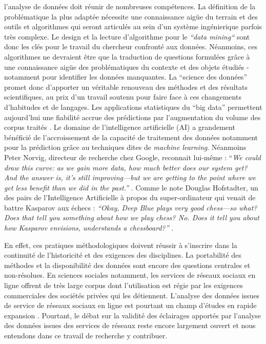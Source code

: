 l{\textquoteright}analyse de donn\'ees doit r\'eunir de nombreuses
comp\'etences. La d\'efinition de la probl\'ematique la plus adapt\'ee
n\'ecessite une connaissance aig\"ue du terrain et des outils et
algorithmes qui seront articul\'es au sein d{\textquoteright}un
syst\`eme ing\'enierique parfois tr\`es complexe. Le design et la
lecture d{\textquoteright}algorithme pour le
\textit{{\textquotedblleft}data mining{\textquotedblleft}} sont donc
les cl\'es pour le travail du chercheur confront\'e aux donn\'ees.
N\'eanmoins, ces algorithmes ne devraient \^etre que la traduction de
questions formul\'ees gr\^ace \`a une connaissance aig\"ue des
probl\'ematiques du contexte et des objets \'etudi\'es - notamment pour
identifier les donn\'ees manquantes. La {\textquotedblleft}science des
donn\'ees{\textquotedblright} promet donc d{\textquoteright}apporter un
v\'eritable renouveau des m\'ethodes et des r\'esultats scientifiques,
au prix d{\textquoteright}un travail soutenu pour faire face \`a ces
changements d{\textquoteright}habitudes et de langages. Les
applications statistiques du {\textquotedblleft}big
data{\textquotedblright} permettent aujourd{\textquoteright}hui une
fiabilit\'e accrue des pr\'edictions par l{\textquoteright}augmentation
du volume des corpus trait\'es \cite{Breiman2001}. Le domaine de
l{\textquoteright}intelligence artificielle (AI) a grandement
b\'en\'efici\'e de l{\textquoteright}accroissement de la capacit\'e de
traitement des donn\'ees notamment pour la pr\'ediction gr\^ace au
techniques dites de \textit{machine learning}. N\'eanmoins Peter
Norvig, directeur de recherche chez Google, reconnait lui-m\^eme :
{\textquotedblleft}\textit{We could draw this curve: as we gain more
data, how much better does our system get? And the answer is,
it{\textquoteright}s still improving---but we are getting to the point
where we get less benefit than we did in the past.{\textquotedblright}
}\cite{Somers2013}. Comme le note Douglas Hofstadter, un des pairs de
l{\textquoteright}Intelligence Artificielle \`a propos du
super-ordinateur qui venait de battre Kasparov aux \'echecs :
\textit{{\textquotedblleft}Okay, Deep Blue plays very good chess---so
what? Does that tell you something about how we play chess? No. Does it
tell you about how Kasparov envisions, understands a
chessboard?{\textquotedblright} }\cite{Somers2013}. 

En effet, ces pratiques m\'ethodologiques doivent r\'eussir \`a
s{\textquoteright}inscrire dans la continuit\'e de
l{\textquoteright}historicit\'e et des exigences des disciplines. La
portabilit\'e des m\'ethodes et la disponibilit\'e des donn\'ees sont
encore des questions centrales et non-r\'esolues. En sciences sociales
notamment, les services de r\'eseaux sociaux en ligne offrent de tr\`es
large corpus dont l{\textquoteright}utilisation est r\'egie par les
exigences commerciales des soci\'et\'es priv\'ees qui les d\'etiennent.
L{\textquoteright}analyse des donn\'ees issues de service de r\'eseaux
sociaux en ligne est pourtant un champ d{\textquoteright}\'etudes en
rapide expansion \cite{Nettleton2013}. Pourtant, le d\'ebat sur la
validit\'e des \'eclairages apport\'es par l{\textquoteright}analyse
des donn\'ees issues des services de r\'eseaux reste encore largement
ouvert et nous entendons dans ce travail de recherche y contribuer. 

